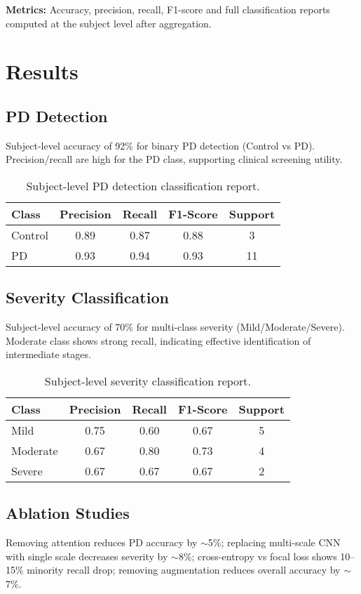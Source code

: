 \documentclass[conference]{IEEEtran}
\begin{document}
\textbf{Metrics:} Accuracy, precision, recall, F1-score and full classification reports computed at the subject level after aggregation.

\section{Results}
\subsection{PD Detection}
Subject-level accuracy of 92\% for binary PD detection (Control vs PD). Precision/recall are high for the PD class, supporting clinical screening utility.

\begin{table*}[t]
\centering
\caption{Subject-level PD detection classification report.}
\label{tab:pd_report}
\begin{tabular}{lcccc}
\toprule
Class & Precision & Recall & F1-Score & Support \\
\midrule
Control & 0.89 & 0.87 & 0.88 & 3 \\
PD      & 0.93 & 0.94 & 0.93 & 11 \\
\bottomrule
\end{tabular}
\end{table*}

\subsection{Severity Classification}
Subject-level accuracy of 70\% for multi-class severity (Mild/Moderate/Severe). Moderate class shows strong recall, indicating effective identification of intermediate stages.

\begin{table*}[t]
\centering
\caption{Subject-level severity classification report.}
\label{tab:sev_report}
\begin{tabular}{lcccc}
\toprule
Class & Precision & Recall & F1-Score & Support \\
\midrule
Mild     & 0.75 & 0.60 & 0.67 & 5 \\
Moderate & 0.67 & 0.80 & 0.73 & 4 \\
Severe   & 0.67 & 0.67 & 0.67 & 2 \\
\bottomrule
\end{tabular}
\end{table*}

\subsection{Ablation Studies}
Removing attention reduces PD accuracy by $\sim$5\%; replacing multi-scale CNN with single scale decreases severity by $\sim$8\%; cross-entropy vs focal loss shows 10--15\% minority recall drop; removing augmentation reduces overall accuracy by $\sim$7\%.
\end{document}
